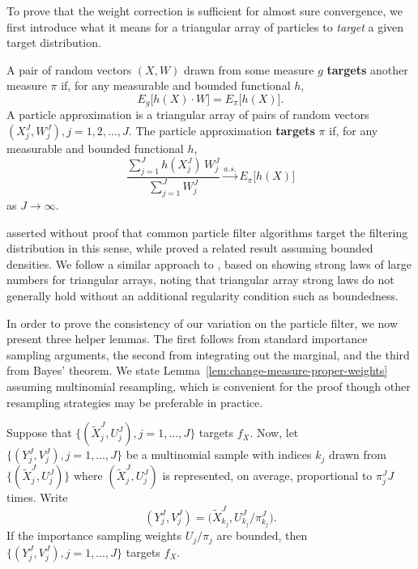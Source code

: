 To prove that the weight correction is sufficient for almost sure convergence, we first introduce what it means for a triangular array of particles to \textit{target} a given target distribution. 

\begin{defn}[Targeting]
    A pair of random vectors $(X, W)$ drawn from some measure $g$ \textbf{targets} another measure $\pi$ if, for any measurable and bounded functional $h$,
\begin{equation}
    E_g\big[h(X) \cdot W\big]=E_\pi\big[h(X)\big].
\end{equation}  
    A particle approximation is a triangular array of pairs of random vectors $(X^J_j, W^J_j), j=1,2, \ldots,J$.
    The particle approximation \textbf{targets} $\pi$ if, for any measurable and bounded functional $h$,
\begin{equation}
    \frac{\sum_{j=1}^J h(X^J_j) \, W^J_j}{\sum_{j=1}^J W^J_j} \stackrel{a.s.}{\to} E_\pi\big[h(X)\big]
\end{equation}
as $J \to \infty$.
\end{defn}
\cite{chopin04} asserted without proof that common particle filter algorithms target the filtering distribution in this sense, while \cite{chopin20} proved a related result assuming bounded densities.
We follow a similar approach to \cite{chopin20}, based on showing strong laws of large numbers for triangular arrays, noting that triangular array strong laws do not generally hold without an additional regularity condition such as boundedness.
 
In order to prove the consistency of our variation on the particle filter, we now present three helper lemmas.
The first follows from standard importance sampling arguments, the second from integrating out the marginal, and the third from Bayes' theorem. 
We state Lemma~\ref{lem:change-measure-proper-weights} assuming multinomial resampling, which is convenient for the proof though other resampling strategies may be preferable in practice.

\begin{lem}
    \label{lem:change-measure-proper-weights}
    Suppose that $\{(\tilde X_j^J,U_j^J),j=1,\dots,J\}$ targets $f_X$. Now, let $\{(Y_j^J,V_j^J),j=1,\dots,J\}$ be a multinomial sample with indices $k_j$ drawn from $\{(\tilde X_j^J,U_j^J)\}$ where $(\tilde X_j^J,U_j^J)$ is represented, on average, proportional to $\pi^J_j J$ times. Write
    \begin{equation}
    (Y_j^J,V_j^J) = \big(\tilde X^J_{k_j},U^J_{k_j}\big/\pi^J_{k_j}\big).
    \end{equation} 
    If the importance sampling weights $U_j/\pi_j$ are bounded, then $\{(Y^J_j,V^J_j),j=1,\dots,J\}$ targets $f_X$.
\end{lem}

